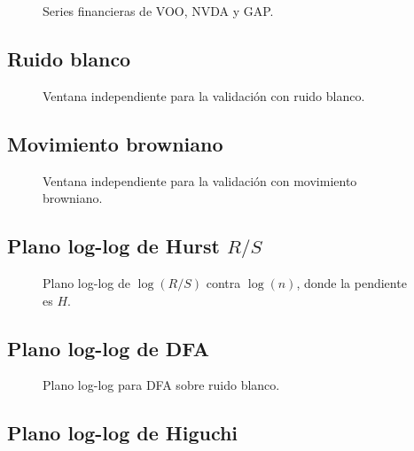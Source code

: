 \documentclass[12pt,a4paper]{article}
\begin{document}
\begin{figure}[H]
    \centering
    \fbox{\rule{0pt}{7cm}\rule{0.9\linewidth}{0pt}}
    \caption{Series financieras de VOO, NVDA y GAP.}
\end{figure}

\subsection{Ruido blanco}

\begin{figure}[H]
    \centering
    \fbox{\rule{0pt}{7cm}\rule{0.9\linewidth}{0pt}}
    \caption{Ventana independiente para la validación con ruido blanco.}
\end{figure}

\subsection{Movimiento browniano}

\begin{figure}[H]
    \centering
    \fbox{\rule{0pt}{7cm}\rule{0.9\linewidth}{0pt}}
    \caption{Ventana independiente para la validación con movimiento browniano.}
\end{figure}

\subsection{Plano log-log de Hurst \(R/S\)}

\begin{figure}[H]
    \centering
    \fbox{\rule{0pt}{7cm}\rule{0.9\linewidth}{0pt}}
    \caption{Plano log-log de \(\log(R/S)\) contra \(\log(n)\), donde la pendiente es \(H\).}
\end{figure}

\subsection{Plano log-log de DFA}

\begin{figure}[H]
    \centering
    \fbox{\rule{0pt}{7cm}\rule{0.9\linewidth}{0pt}}
    \caption{Plano log-log para DFA sobre ruido blanco.}
\end{figure}

\subsection{Plano log-log de Higuchi}
\end{document}
